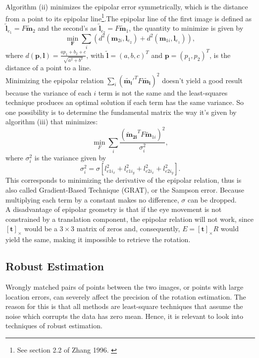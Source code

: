 Algorithm (ii) minimizes the epipolar error symmetrically, which is the distance from a point to its epipolar line\footnote{See section 2.2 of Zhang 1996. \cite{detep}}.The epipolar line of the first image is defined as $\widetilde{\mathbf{l}}_{e_1} =  F\widetilde{\mathbf{m}}_{2}$ and the second's as $\widetilde{\mathbf{l}}_{e_2} =  F\widetilde{\mathbf{m}}_{1}$, the quantity to minimize is given by
\begin{equation}
	\min _{\mathbf{F}} \sum_{i}\left(d^{2}\left(\mathbf{m}_{2i}, \mathbf{l}_{e_{2}}\right)+d^{2}\left(\mathbf{m}_{1i}, \mathbf{l}_{e_{1}}\right)\right),
\end{equation}
where $d\left(\mathbf{p}, \mathbf{l}\right)=\frac{a p_{1}+b _{2}+c}{\sqrt{a^{2}+b^{2}}}$, with $\widetilde{\mathbf{l}} = (a, b, c)^{T}$
and $\mathbf{p}=\left(p_{1}, p_{2}\right)^{T}$, is the distance of a point to a line.\\

Minimizing the epipolar relation $ \sum_i (\mathbf{\widetilde{m_i}}'^T F \mathbf{\widetilde{m_i}})^2$ doesn't yield a good result because the variance of each $i$ term is not the same and the least-squares technique produces an optimal solution if each term has the same variance. So one possibility is to determine the fundamental matrix the way it's given by algorithm (iii) that minimizes:
\begin{equation}
\min_F \sum_i \frac{ (\mathbf{\widetilde{\mathbf{m}}_{2i}}^T F \widetilde{\mathbf{m}}_{1i})^2}{\sigma_i^2},
\end{equation}
where $\sigma_i^2$ is the variance given by 
\begin{equation}
\sigma_i^2 = \sigma [l_{{e1i}_x}^2 + l_{{e1i}_y}^2 + l_{{e2i}_x}^2 + l_{{e2i}_y}^2].
\end{equation}
This corresponds to minimizing the derivative of the epipolar relation, thus is also called Gradient-Based Technique (GRAT), or the Sampson error.
Because multiplying each term by a constant makes no difference, $\sigma$ can be dropped.\\

A disadvantage of epipolar geometry is that if the eye movement is not constrained by a translation component, the epipolar relation will not work, since $[\mathbf{t}]_\times$ would be a $3\times3$ matrix of zeros and, consequently, $E = [\mathbf{t}]_\times R$ would yield the same, making it impossible to retrieve the rotation.\\

\subsection{Robust Estimation}
\label{feinereg}
Wrongly matched pairs of points between the two images, or points with large location errors, can severely affect the precision of the rotation estimation. The reason for this is that all methods are least-square techniques that assume the noise which corrupts the data has zero mean. Hence, it is relevant to look into techniques of robust estimation.

